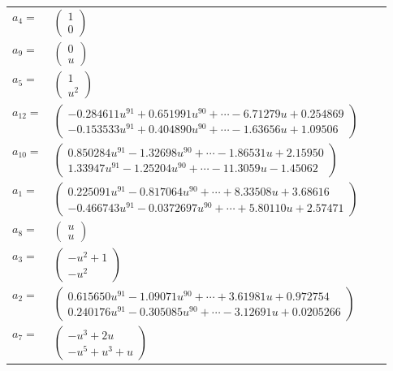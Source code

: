 \documentclass[1p]{elsarticle_modified}
\theoremstyle{definition}
\begin{document}
\begin{tabular}{m{7pt} m{180pt} m{7pt} m{180pt} }
\flushright $a_{4}=$&$\begin{pmatrix}1\\0\end{pmatrix}$ \\
\flushright $a_{9}=$&$\begin{pmatrix}0\\u\end{pmatrix}$ \\
\flushright $a_{5}=$&$\begin{pmatrix}1\\u^2\end{pmatrix}$ \\
\flushright $a_{12}=$&$\begin{pmatrix}-0.284611 u^{91}+0.651991 u^{90}+\cdots-6.71279 u+0.254869\\-0.153533 u^{91}+0.404890 u^{90}+\cdots-1.63656 u+1.09506\end{pmatrix}$ \\
\flushright $a_{10}=$&$\begin{pmatrix}0.850284 u^{91}-1.32698 u^{90}+\cdots-1.86531 u+2.15950\\1.33947 u^{91}-1.25204 u^{90}+\cdots-11.3059 u-1.45062\end{pmatrix}$ \\
\flushright $a_{1}=$&$\begin{pmatrix}0.225091 u^{91}-0.817064 u^{90}+\cdots+8.33508 u+3.68616\\-0.466743 u^{91}-0.0372697 u^{90}+\cdots+5.80110 u+2.57471\end{pmatrix}$ \\
\flushright $a_{8}=$&$\begin{pmatrix}u\\u\end{pmatrix}$ \\
\flushright $a_{3}=$&$\begin{pmatrix}- u^2+1\\- u^2\end{pmatrix}$ \\
\flushright $a_{2}=$&$\begin{pmatrix}0.615650 u^{91}-1.09071 u^{90}+\cdots+3.61981 u+0.972754\\0.240176 u^{91}-0.305085 u^{90}+\cdots-3.12691 u+0.0205266\end{pmatrix}$ \\
\flushright $a_{7}=$&$\begin{pmatrix}- u^3+2 u\\- u^5+u^3+u\end{pmatrix}$ \\

\end{tabular}
\end{document}

